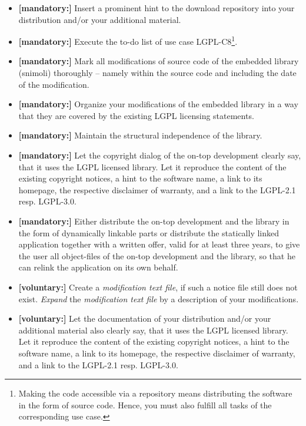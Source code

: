 \begin{description}
\begin{itemize}
  \item \textbf{[mandatory:]} Insert a prominent hint to the download repository
  into your distribution and/or your additional material.
    
  \item \textbf{[mandatory:]} Execute the to-do list of use case LGPL-C8\footnote{
  Making the code accessible via a repository means distributing the software in
  the form of source code. Hence, you must also fulfill all tasks of the
  corresponding use case.}.

  \item \textbf{[mandatory:]} Mark all modifications of source code of the
  embedded library (snimoli) thoroughly -- namely within the source code and
  including the date of the modification.
  
  \item \textbf{[mandatory:]} Organize your modifications of the embedded
  library in a way that they are covered by the existing LGPL licensing
  statements. 

  \item \textbf{[mandatory:]}  Maintain the structural independence of the
  library.
    
  \item \textbf{[mandatory:]} Let the copyright dialog of the on-top development
  clearly say, that it uses the LGPL licensed library. Let it reproduce the
  content of the existing copyright notices, a hint to the software name, a link
  to its homepage, the respective disclaimer of warranty, and a link to the
  LGPL-2.1 resp. LGPL-3.0.
  
  \item \textbf{[mandatory:]} Either distribute the on-top development and the
  library in the form of dynamically linkable parts or distribute the statically
  linked application together with a written offer, valid for at least three
  years, to give the user all object-files of the on-top development and the
  library, so that he can relink the application on its own behalf.
     
  \item \textbf{[voluntary:]} Create a \emph{modification text file}, if such a
  notice file still does not exist. \emph{Expand} the \emph{modification text
  file} by a description of your modifications. 
  
  \item \textbf{[voluntary:]} Let the documentation of your distribution and/or
  your additional material also clearly say, that it uses the LGPL licensed
  library. Let it reproduce the content of the existing copyright notices, a
  hint to the software name, a link to its homepage, the respective disclaimer
  of warranty, and a link to the LGPL-2.1 resp. LGPL-3.0.


\end{itemize}
\end{description}
